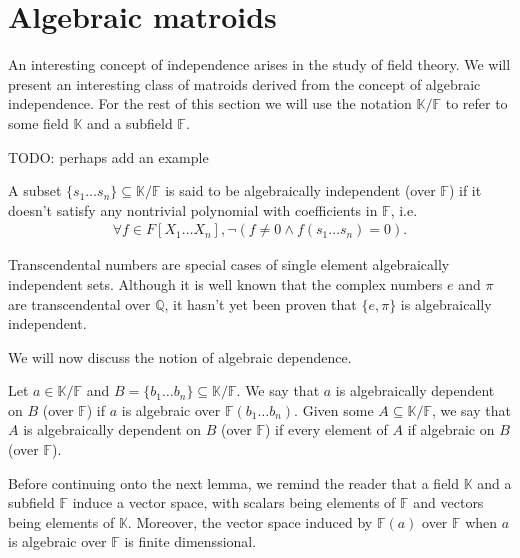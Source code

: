 \section{Algebraic matroids}

An interesting concept of independence arises in the study of field theory. We will present an interesting class of matroids derived from the concept of algebraic independence. For the rest of this section we will use the notation $\mathbb K / \mathbb F$ to refer to some field $\mathbb K$ and a subfield $\mathbb F$.

TODO: perhaps add an example

\begin{defn}
  A subset $\{ s_1 \ldots s _n \} \subseteq \mathbb K / \mathbb F$ is said to be algebraically independent (over $\mathbb F$) if it doesn't satisfy any nontrivial polynomial with coefficients in $\mathbb{F} $, i.e.
  \begin{align*}
  \forall f \in F[X _1 \ldots X _n], \neg\left( f \neq  0 \land  f(s _1 \ldots s _n) = 0\right).
  \end{align*}
\end{defn}

Transcendental numbers are special cases of single element algebraically independent sets. Although it is well known that the complex numbers $e$ and $\pi$ are transcendental over $\mathbb{Q} $, it hasn't yet been proven that $\{e, \pi \}$ is algebraically independent.

We will now discuss the notion of algebraic dependence.

\begin{defn}
  Let $a \in \mathbb K / \mathbb F$ and $B = \{b _1 \ldots b _n \} \subseteq  \mathbb K / \mathbb F$. We say that $a$ is algebraically dependent on $B$ (over $ \mathbb{F} $) if $a$ is algebraic over $\mathbb F(b _1 \ldots b _n )$. Given some $A \subseteq  \mathbb K / \mathbb{F} $, we say that $A$ is algebraically dependent on $B$ (over $\mathbb{F} $) if every element of $A$ if algebraic on $B$ (over $\mathbb{F} $).
\end{defn}

Before continuing onto the next lemma, we remind the reader that a field $\mathbb K$ and a subfield $\mathbb{F}$ induce a vector space, with scalars being elements of $\mathbb{F} $ and vectors being elements of $\mathbb K$. Moreover, the vector space induced by $\mathbb{F} (a)$ over $\mathbb{F} $ when $a$ is algebraic over $\mathbb{F} $ is finite dimenssional.

